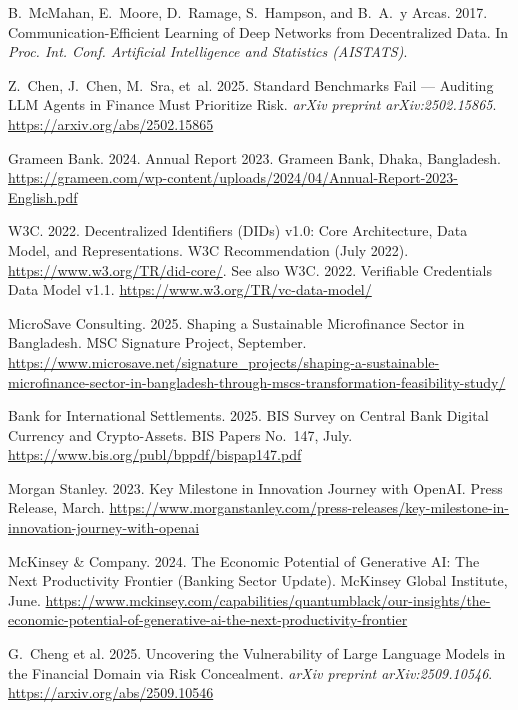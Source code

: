 \documentclass[12pt, a4paper]{report}
\begin{document}
{\begin{enumerate}[label={[\arabic*]}]
\item B.~McMahan, E.~Moore, D.~Ramage, S.~Hampson, and B.~A.~y Arcas. 2017. Communication-Efficient Learning of Deep Networks from Decentralized Data. In \emph{Proc. Int. Conf. Artificial Intelligence and Statistics (AISTATS)}.

\item Z.~Chen, J.~Chen, M.~Sra, et~al. 2025. Standard Benchmarks Fail --- Auditing LLM Agents in Finance Must Prioritize Risk. \emph{arXiv preprint arXiv:2502.15865}. \url{https://arxiv.org/abs/2502.15865}

\item Grameen Bank. 2024. Annual Report 2023. Grameen Bank, Dhaka, Bangladesh. \url{https://grameen.com/wp-content/uploads/2024/04/Annual-Report-2023-English.pdf}

\item W3C. 2022. Decentralized Identifiers (DIDs) v1.0: Core Architecture, Data Model, and Representations. W3C Recommendation (July 2022). \url{https://www.w3.org/TR/did-core/}. See also W3C. 2022. Verifiable Credentials Data Model v1.1. \url{https://www.w3.org/TR/vc-data-model/}

\item MicroSave Consulting. 2025. Shaping a Sustainable Microfinance Sector in Bangladesh. MSC Signature Project, September. \url{https://www.microsave.net/signature_projects/shaping-a-sustainable-microfinance-sector-in-bangladesh-through-mscs-transformation-feasibility-study/}

\item Bank for International Settlements. 2025. BIS Survey on Central Bank Digital Currency and Crypto-Assets. BIS Papers No.~147, July. \url{https://www.bis.org/publ/bppdf/bispap147.pdf}

\item Morgan Stanley. 2023. Key Milestone in Innovation Journey with OpenAI. Press Release, March. \url{https://www.morganstanley.com/press-releases/key-milestone-in-innovation-journey-with-openai}

\item McKinsey \& Company. 2024. The Economic Potential of Generative AI: The Next Productivity Frontier (Banking Sector Update). McKinsey Global Institute, June. \url{https://www.mckinsey.com/capabilities/quantumblack/our-insights/the-economic-potential-of-generative-ai-the-next-productivity-frontier}

\item G.~Cheng et al. 2025. Uncovering the Vulnerability of Large Language Models in the Financial Domain via Risk Concealment. \emph{arXiv preprint arXiv:2509.10546}. \url{https://arxiv.org/abs/2509.10546}


\end{enumerate}}
\end{document}
